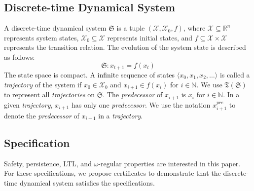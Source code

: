 \documentclass[acmlarge]{acmart}
\begin{document}
\subsection{Discrete-time Dynamical System}
\label{dtds}
A discrete-time dynamical system $\mathfrak{S}$ is a tuple $(\mathcal{X}, \mathcal{X}_0, f)$, where $\mathcal{X} \subseteq \mathbb{R}^n$ represents system states, $\mathcal{X}_{0} \subseteq \mathcal{X}$ represents initial states, and $f \subseteq \mathcal{X} \times \mathcal{X}$ represents the transition relation. The evolution of the system state is described as follows:
\[
\mathfrak{S}: x_{t+1} = f(x_t)
\]
The state space is compact. A infinite sequence of states $\langle x_0, x_1, x_2, \dots \rangle$ is called a \emph{trajectory} of the system if $x_0 \in \mathcal{X}_0$ and $x_{i+1} \in f(x_{i})$ for $i \in \mathbb{N}$. We use $\mathfrak{T}(\mathfrak{S})$ to represent all \emph{trajectories} on $\mathfrak{S}$. The \emph{predecessor} of \(x_{i+1}\) is \(x_i\) for \(i \in \mathbb{N}\). In a given \emph{trajectory}, \(x_{i+1}\) has only one \emph{predecessor}. We use the notation \(x_{i+1}^{pre}\) to denote the \emph{predecessor} of \(x_{i+1}\) in a \emph{trajectory}.
\subsection{Specification}
\label{specification123}
Safety, persistence, LTL, and $\omega$-regular properties are interested in this paper. For these specifications, we propose certificates to demonstrate that the discrete-time dynamical system satisfies the specifications.
\end{document}

